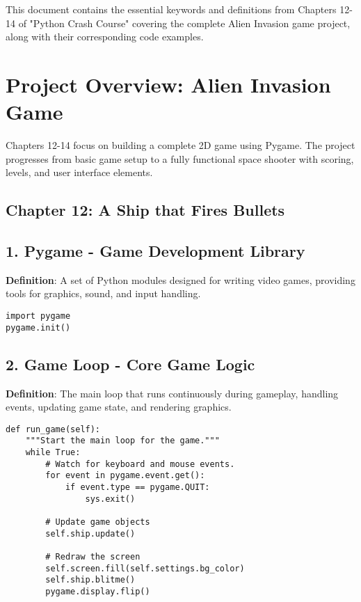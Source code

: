 
This document contains the essential keywords and definitions from Chapters 12-14 of "Python Crash Course" covering the complete Alien Invasion game project, along with their corresponding code examples.

\section*{Project Overview: Alien Invasion Game}
Chapters 12-14 focus on building a complete 2D game using Pygame. The project progresses from basic game setup to a fully functional space shooter with scoring, levels, and user interface elements.

\subsection*{Chapter 12: A Ship that Fires Bullets}

\subsection*{1. Pygame - Game Development Library}
\textbf{Definition}: A set of Python modules designed for writing video games, providing tools for graphics, sound, and input handling.

\begin{lstlisting}
import pygame
pygame.init()
\end{lstlisting}

\subsection*{2. Game Loop - Core Game Logic}
\textbf{Definition}: The main loop that runs continuously during gameplay, handling events, updating game state, and rendering graphics.

\begin{lstlisting}
def run_game(self):
    """Start the main loop for the game."""
    while True:
        # Watch for keyboard and mouse events.
        for event in pygame.event.get():
            if event.type == pygame.QUIT:
                sys.exit()
        
        # Update game objects
        self.ship.update()
        
        # Redraw the screen
        self.screen.fill(self.settings.bg_color)
        self.ship.blitme()
        pygame.display.flip()
\end{lstlisting}

